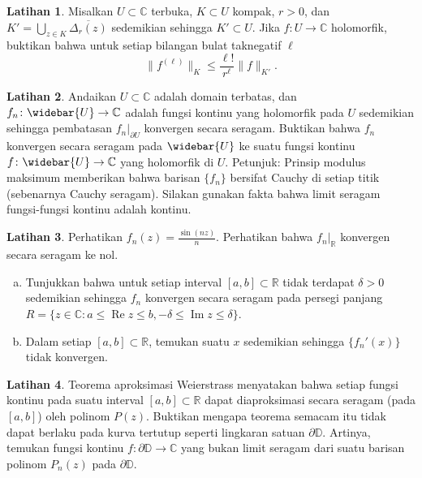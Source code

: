 \documentclass[12pt,openany]{book}
\renewcommand{\Re}{\operatorname{Re}}
\renewcommand{\Im}{\operatorname{Im}}
\newcommand{\snorm}[1]{\lVert {#1} \rVert}
\newcommand{\C}{{\mathbb{C}}}
\newcommand{\R}{{\mathbb{R}}}
\newcommand{\D}{{\mathbb{D}}}
\theoremstyle{plain}
\theoremstyle{remark}
\theoremstyle{definition}
\newenvironment{exbox}{%
    \def\FrameCommand{\vrule width 1pt \relax\hspace{10pt}}%
    \MakeFramed{\advance\hsize-\width\FrameRestore}%
}{%
    \endMakeFramed
}
\newenvironment{exparts}{%
    \leavevmode\begin{enumerate}[a),noitemsep,topsep=0pt,parsep=0pt,partopsep=0pt]
}{%
    \end{enumerate}
}
\theoremstyle{exercise}
\newtheorem{exercise}{Latihan}[section]
\theoremstyle{example}
\begin{document}
\begin{exbox}
\begin{exercise}
Misalkan $U \subset \C$ terbuka, $K \subset U$ kompak, $r > 0$, dan
$K' = \bigcup_{z\in K} \overline{\Delta_r(z)}$
sedemikian sehingga $K' \subset U$.  Jika $f \colon U \to \C$ holomorfik,
buktikan bahwa untuk setiap bilangan bulat taknegatif $\ell$
\begin{equation*}
\snorm{f^{(\ell)}}_{K}
\leq
\frac{\ell!}{r^\ell}
\snorm{f}_{K'} .
\end{equation*}
\end{exercise}

\begin{exercise} \label{exercise:convergeboundary}
Andaikan $U \subset \C$ adalah domain terbatas, dan $f_n \colon \widebar{U} \to
\C$ adalah fungsi kontinu yang holomorfik pada $U$ sedemikian sehingga
pembatasan $f_n|_{\partial U}$ konvergen secara seragam.  Buktikan bahwa
$f_n$ konvergen secara seragam pada $\widebar{U}$ ke suatu fungsi kontinu
$f \colon \widebar{U} \to \C$ yang holomorfik di $U$.
Petunjuk: Prinsip modulus maksimum memberikan bahwa barisan
$\{ f_n \}$
bersifat Cauchy di setiap titik (sebenarnya Cauchy seragam).  Silakan gunakan
fakta bahwa limit seragam fungsi-fungsi kontinu adalah kontinu.
\end{exercise}

\begin{exercise}
Perhatikan $f_n(z) = \frac{\sin(nz)}{n}$.  Perhatikan bahwa $f_n|_{\R}$ konvergen
secara seragam ke nol.
\begin{exparts}
\item
Tunjukkan bahwa untuk setiap interval $[a,b] \subset \R$ tidak terdapat $\delta > 0$ sedemikian sehingga
$f_n$ konvergen secara seragam pada persegi panjang $R = \bigl\{ z \in \C : a \leq \Re z
\leq b , -\delta \leq \Im z \leq \delta \bigr\}$.
\item
Dalam setiap $[a,b] \subset \R$, temukan 
suatu $x$ sedemikian sehingga $\{ f_n'(x) \}$ tidak konvergen.
\end{exparts}
\end{exercise}

\begin{exercise}
\pagebreak[2]
Teorema aproksimasi Weierstrass menyatakan bahwa setiap fungsi kontinu pada suatu
interval $[a,b] \subset \R$ dapat diaproksimasi secara seragam (pada $[a,b]$) oleh
polinom $P(z)$.  Buktikan mengapa teorema semacam itu tidak dapat berlaku
pada kurva tertutup seperti lingkaran satuan $\partial \D$.  Artinya,
temukan fungsi kontinu $f \colon \partial \D \to \C$ yang
bukan limit seragam dari suatu barisan polinom $P_n(z)$ pada $\partial \D$.
\end{exercise}


\end{exbox}
\end{document}
